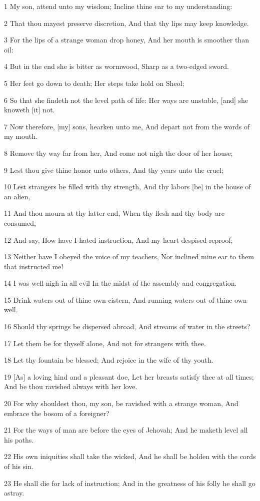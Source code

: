 \par 1 My son, attend unto my wisdom; Incline thine ear to my understanding:
\par 2 That thou mayest preserve discretion, And that thy lips may keep knowledge.
\par 3 For the lips of a strange woman drop honey, And her mouth is smoother than oil:
\par 4 But in the end she is bitter as wormwood, Sharp as a two-edged sword.
\par 5 Her feet go down to death; Her steps take hold on Sheol;
\par 6 So that she findeth not the level path of life: Her ways are unstable, [and] she knoweth [it] not.
\par 7 Now therefore, [my] sons, hearken unto me, And depart not from the words of my mouth.
\par 8 Remove thy way far from her, And come not nigh the door of her house;
\par 9 Lest thou give thine honor unto others, And thy years unto the cruel;
\par 10 Lest strangers be filled with thy strength, And thy labors [be] in the house of an alien,
\par 11 And thou mourn at thy latter end, When thy flesh and thy body are consumed,
\par 12 And say, How have I hated instruction, And my heart despised reproof;
\par 13 Neither have I obeyed the voice of my teachers, Nor inclined mine ear to them that instructed me!
\par 14 I was well-nigh in all evil In the midst of the assembly and congregation.
\par 15 Drink waters out of thine own cistern, And running waters out of thine own well.
\par 16 Should thy springs be dispersed abroad, And streams of water in the streets?
\par 17 Let them be for thyself alone, And not for strangers with thee.
\par 18 Let thy fountain be blessed; And rejoice in the wife of thy youth.
\par 19 [As] a loving hind and a pleasant doe, Let her breasts satisfy thee at all times; And be thou ravished always with her love.
\par 20 For why shouldest thou, my son, be ravished with a strange woman, And embrace the bosom of a foreigner?
\par 21 For the ways of man are before the eyes of Jehovah; And he maketh level all his paths.
\par 22 His own iniquities shall take the wicked, And he shall be holden with the cords of his sin.
\par 23 He shall die for lack of instruction; And in the greatness of his folly he shall go astray.

